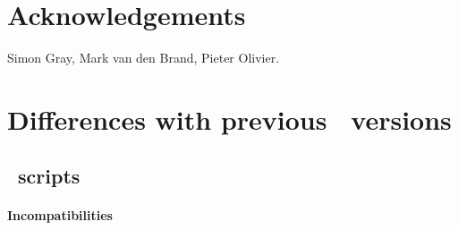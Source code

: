 

\section*{Acknowledgements}
Simon Gray, Mark van den Brand, Pieter Olivier.
\appendix


\newpage
\section{Differences with previous \TB\ versions}

\subsection{\T\ scripts}

\paragraph{Incompatibilities}
